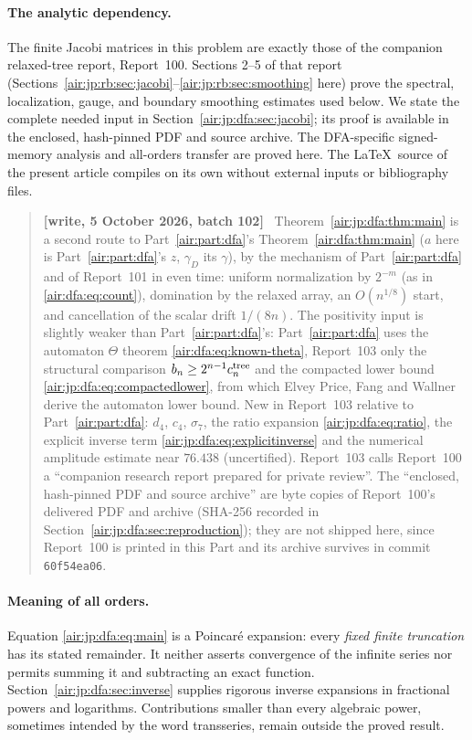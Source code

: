 \documentclass[11pt,letterpaper]{article}
\numberwithin{equation}{section}
\theoremstyle{remark}
\newenvironment{writenotejp}{\par\smallskip\begin{quote}\small\textbf{[write, 5 October 2026, batch 102]}\ }{\end{quote}\smallskip}
\begin{document}
\paragraph{The analytic dependency.}
The finite Jacobi matrices in this problem are exactly those of the companion relaxed-tree report, Report~100. Sections 2--5 of that report (Sections~\ref{air:jp:rb:sec:jacobi}--\ref{air:jp:rb:sec:smoothing} here) prove the spectral, localization, gauge, and boundary smoothing estimates used below. We state the complete needed input in Section~\ref{air:jp:dfa:sec:jacobi}; its proof is available in the enclosed, hash-pinned PDF and source archive. The DFA-specific signed-memory analysis and all-orders transfer are proved here. The \LaTeX\ source of the present article compiles on its own without external inputs or bibliography files.
\begin{writenotejp}
Theorem~\ref{air:jp:dfa:thm:main} is a second route to Part~\ref{air:part:dfa}'s Theorem~\ref{air:dfa:thm:main} ($a$ here is Part~\ref{air:part:dfa}'s $z$, $\gamma_D$ its $\gamma$), by the mechanism of Part~\ref{air:part:dfa} and of Report~101 in even time: uniform normalization by $2^{-m}$ (as in \eqref{air:dfa:eq:count}), domination by the relaxed array, an $O(n^{1/8})$ start, and cancellation of the scalar drift $1/(8n)$. The positivity input is slightly weaker than Part~\ref{air:part:dfa}'s: Part~\ref{air:part:dfa} uses the automaton $\Theta$ theorem \eqref{air:dfa:eq:known-theta}, Report~103 only the structural comparison $b_n\ge2^{n-1}c^{\rm tree}_n$ and the compacted lower bound \eqref{air:jp:dfa:eq:compactedlower}, from which Elvey Price, Fang and Wallner derive the automaton lower bound. New in Report~103 relative to Part~\ref{air:part:dfa}: $d_4$, $c_4$, $\sigma_7$, the ratio expansion \eqref{air:jp:dfa:eq:ratio}, the explicit inverse term \eqref{air:jp:dfa:eq:explicitinverse} and the numerical amplitude estimate near $76.438$ (uncertified). Report~103 calls Report~100 a ``companion research report prepared for private review''. The ``enclosed, hash-pinned PDF and source archive'' are byte copies of Report~100's delivered PDF and archive (SHA-256 recorded in Section~\ref{air:jp:dfa:sec:reproduction}); they are not shipped here, since Report~100 is printed in this Part and its archive survives in commit \texttt{60f54ea06}.
\end{writenotejp}

\paragraph{Meaning of all orders.}
Equation \eqref{air:jp:dfa:eq:main} is a Poincar\'e expansion: every \emph{fixed finite truncation} has its stated remainder. It neither asserts convergence of the infinite series nor permits summing it and subtracting an exact function. Section~\ref{air:jp:dfa:sec:inverse} supplies rigorous inverse expansions in fractional powers and logarithms. Contributions smaller than every algebraic power, sometimes intended by the word transseries, remain outside the proved result.
\end{document}
